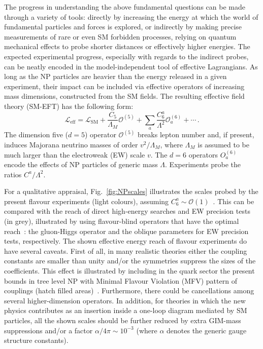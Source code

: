 \documentclass[../report.tex]{subfiles}
\begin{document}
The progress in understanding the above fundamental questions can be made through a variety of tools: directly by  increasing the energy at which  the world of fundamental particles and forces is explored, or indirectly by making precise measurements of rare or even SM forbidden processes, relying on quantum mechanical effects to probe shorter distances or effectively higher energies.  
The expected experimental progress, especially with regards to the indirect probes,  can be  neatly encoded in the model-independent tool of effective Lagrangians. As long as the NP particles are heavier than the energy released in a given experiment, their impact can be included via effective operators of increasing mass dimensions, constructed from the SM fields. The resulting effective field theory (SM-EFT) has the following form: 
\begin{equation}
    \mathcal{L}_{\text{eff}}= \mathcal{L}_{\text{SM}} + \frac{C_5}{\Lambda_M}\mathcal{O}^{(5)} +  \sum_a \frac{C_{6}^{a}}{\Lambda^2}\mathcal{O}^{(6)}_{a}+\cdots \,. 
    \label{effective}
\end{equation}
The dimension five ($d=5$) operator $\mathcal{O}^{(5)}$  
breaks lepton number and, if present, induces Majorana neutrino masses of order  $v^2/\Lambda_M$, where  $\Lambda_M$ is assumed to be 
much larger than the electroweak (EW) scale $v$. The $d=6$ operators ${O}^{(6)}_{a}$  
encode the effects of  
NP particles of generic mass $\Lambda$. 
Experiments probe the ratios $C^a / \Lambda^2$. 

For a qualitative appraisal, Fig.~\ref{fig:NPscales} illustrates the scales probed  by the present flavour  experiments (light colours), assuming  $C_6^a\sim {\mathcal O}(1)$~\cite{Nir_Private}. This can be compared with the reach of direct high-energy searches and EW precision tests (in grey), illustrated  by using flavour-blind operators that have the optimal reach~\cite{Nir_Private}: the gluon-Higgs operator and the oblique parameters for EW precision tests, respectively.  The shown effective energy reach of flavour experiments do have several caveats. First of all, in many realistic theories either the coupling constants are  smaller than unity and/or the symmetries suppress the sizes of the coefficients.  This effect is illustrated by including in the quark sector the present bounds in tree level NP with Minimal Flavour Violation (MFV) pattern of couplings (hatch filled areas)~\cite{Chivukula:1987py,Buras:2000dm,DAmbrosio:2002vsn,Cirigliano:2005ck}. Furthermore, there could be cancellations among several higher-dimension operators. In addition, for theories in which the new physics contributes as an insertion inside a one-loop diagram mediated by SM particles,  
all the shown scales should be further reduced by extra
GIM-mass suppressions and/or
a factor $\alpha /4\pi \sim10^{-3}$ 
(where $\alpha$ denotes the generic gauge structure constants).
\end{document}
